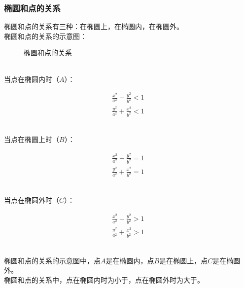 \documentclass[UTF8]{ctexart}
\begin{document}
\subsubsection{椭圆和点的关系}
    椭圆和点的关系有三种：在椭圆上，在椭圆内，在椭圆外。\\[3mm]
    椭圆和点的关系的示意图：
    \begin{figure}[h!]
        \begin{center}
            \caption{椭圆和点的关系}
        \end{center}
    \end{figure}\\
    当点在椭圆内时（$A$）：
    \begin{large}
        \begin{align*}
            \frac{x^2}{a^2}+\frac{y^2}{b^2}<1\\[4mm]
            \frac{y^2}{a^2}+\frac{x^2}{b^2}<1
        \end{align*}
    \end{large}\\
    当点在椭圆上时（$B$）：
    \begin{large}
        \begin{align*}
            \frac{x^2}{a^2}+\frac{y^2}{b^2}=1\\[4mm]
            \frac{y^2}{a^2}+\frac{x^2}{b^2}=1
        \end{align*}
    \end{large}\\
    当点在椭圆外时（$C$）：
    \begin{large}
        \begin{align*}
            \frac{x^2}{a^2}+\frac{y^2}{b^2}>1\\[4mm]
            \frac{y^2}{a^2}+\frac{x^2}{b^2}>1
        \end{align*}
    \end{large}\\
    椭圆和点的关系的示意图中，点$A$是在椭圆内，点$B$是在椭圆上，点$C$是在椭圆外。\\[3mm]
    椭圆和点的关系中，点在椭圆内时为小于，点在椭圆外时为大于。
\end{document}
